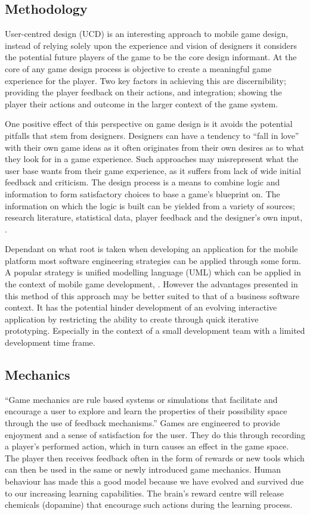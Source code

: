 \documentclass[final]{cmpreport}
\begin{document}
\subsection{Methodology}

User-centred design (UCD) is an interesting approach to mobile game design, instead of relying solely upon the experience and vision of designers it considers the potential future players of the game to be the core design informant. At the core of any game design process is objective to create a meaningful game experience for the player. Two key factors in achieving this are discernibility; providing the player feedback on their actions, and integration; showing the player their actions and outcome in the larger context of the game system.

One positive effect of this perspective on game design is it avoids the potential pitfalls that stem from designers. Designers can have a tendency to ``fall in love'' with their own game ideas as it often originates from their own desires as to what they look for in a game experience. Such approaches may misrepresent what the user base wants from their game experience, as it suffers from lack of wide initial feedback and criticism. The design process is a means to combine logic and information to form satisfactory choices to base a game's blueprint on. The information on which the logic is built can be yielded from a variety of sources; research literature, statistical data, player feedback and the designer's own input, \cite{ErmiMayra}.

Dependant on what root is taken when developing an application for the mobile platform most software engineering strategies can be applied through some form. A popular strategy is unified modelling language (UML) which can be applied in the context of mobile game development, \cite{UML}. However the advantages presented in this method of this approach may be better suited to that of a business software context. It has the potential hinder development of an evolving interactive application by restricting the ability to create through quick iterative prototyping. Especially in the context of a small development team with a limited development time frame.

\subsection{Mechanics}

``Game mechanics are rule based systems or simulations that facilitate and encourage a user to explore and learn the properties of their possibility space through the use of feedback mechanisms.''\cite{Koster} Games are engineered to provide enjoyment and a sense of satisfaction for the user. They do this through recording a player's performed action, which in turn causes an effect in the game space. The player then receives feedback often in the form of rewards or new tools which can then be used in the same or newly introduced game mechanics. Human behaviour has made this a good model because we have evolved and survived due to our increasing learning capabilities. The brain's reward centre will release chemicals (dopamine) that encourage such actions during the learning process.
\end{document}
